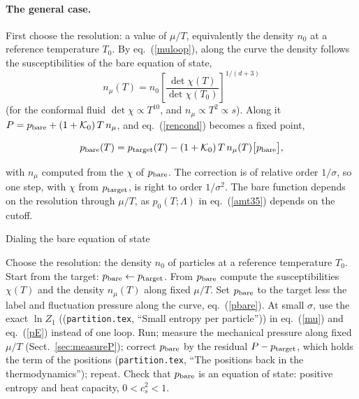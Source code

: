 \documentclass[11pt,aps,preprint,nofootinbib,superscriptaddress,tightenlines]{revtex4-2}
\def\st{\begin{equation}}
\def\stp{\end{equation}}
\def\Eq#1{eq.~(\ref{#1})}
\def\Sect#1{Sect.~\ref{#1}}
\let\oldparagraph\paragraph
\renewcommand{\paragraph}{\par\bigskip\oldparagraph}
\begin{document}
\paragraph{The general case.}  First choose the resolution: a value of $\mu/T$, equivalently the density $n_0$ at a reference temperature $T_0$.  By
\Eq{muloop}, along the curve the density follows the susceptibilities of the bare equation of state,
\st
n_\mu(T)=n_0\left[\frac{\det\chi(T)}{\det\chi(T_0)}\right]^{1/(d+3)}
\stp
(for the conformal fluid $\det\chi\propto T^{10}$, and $n_\mu\propto T^2\propto s$).  Along it $P=p_{\rm bare}+(1+\mathcal K_0)\,T\,n_\mu$, and \Eq{rencond}
becomes a fixed point,
\begin{keyeq}
\st
p_{\rm bare}(T)=p_{\rm target}(T)-(1+\mathcal K_0)\,T\,n_\mu(T)\big[p_{\rm bare}\big],
\label{pbare}
\stp
\end{keyeq}
with $n_\mu$ computed from the $\chi$ of $p_{\rm bare}$.  The correction is of relative order $1/\sigma$, so one step, with $\chi$ from $p_{\rm target}$,
is right to order $1/\sigma^2$.  The bare function depends on the resolution through $\mu/T$, as $p_0(T;\Lambda)$ in \Eq{amt35} depends on the cutoff.

\begin{algobox}{Dialing the bare equation of state}
\begin{algorithmic}[1]
\State Choose the resolution: the density $n_0$ of particles at a reference temperature $T_0$.
\State Start from the target: $p_{\rm bare}\gets p_{\rm target}$.
\Repeat
  \State From $p_{\rm bare}$ compute the susceptibilities $\chi(T)$ and the density $n_\mu(T)$ along fixed $\mu/T$.
  \State Set $p_{\rm bare}$ to the target less the label and fluctuation pressure along the curve, \Eq{pbare}.
\State At small $\sigma$, use the exact $\ln Z_1$ ((\texttt{partition.tex}, ``Small entropy per particle'')) in \Eq{mu} and \Eq{pE} instead of one loop.
\State Run; measure the mechanical pressure along fixed $\mu/T$ (\Sect{sec:measureP}); correct $p_{\rm bare}$ by the residual $P-p_{\rm target}$, which
  holds the term of the positions (\texttt{partition.tex}, ``The positions back in the thermodynamics''); repeat.
\State Check that $p_{\rm bare}$ is an equation of state: positive entropy and heat capacity, $0<c_s^2<1$.
\end{algorithmic}
\end{algobox}
\end{document}
